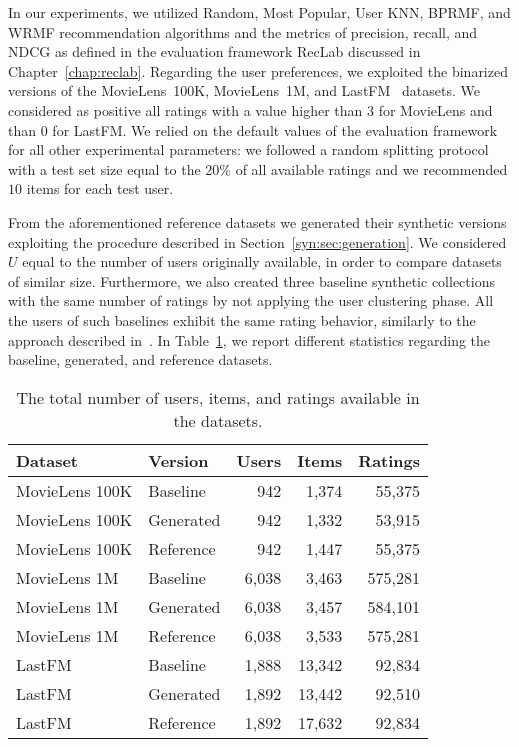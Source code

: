 In our experiments, we utilized Random, Most Popular, User KNN, BPRMF, and WRMF recommendation algorithms and the metrics of precision, recall, and NDCG as defined in the evaluation framework RecLab discussed in Chapter~\ref{chap:reclab}. Regarding the user preferences, we exploited the binarized versions of the MovieLens~100K, MovieLens~1M, and LastFM~\cite{Cantador2011} datasets. We considered as positive all ratings with a value higher than $3$ for MovieLens and than $0$ for LastFM. We relied on the default values of the evaluation framework for all other experimental parameters: we followed a random splitting protocol with a test set size equal to the $20\%$ of all available ratings and we recommended $10$ items for each test user.

From the aforementioned reference datasets we generated their synthetic versions exploiting the procedure described in Section~\ref{syn:sec:generation}. We considered $U$ equal to the number of users originally available, in order to compare datasets of similar size. Furthermore, we also created three baseline synthetic collections with the same number of ratings by not applying the user clustering phase. All the users of such baselines exhibit the same rating behavior, similarly to the approach described in~\cite{CarmenRodriguez-Hernandez2017}. In Table~\ref{syn:tab:stats}, we report different statistics regarding the baseline, generated, and reference datasets.

\begin{table}
\centering
\begin{tabular}{@{}llrrr@{}}
\toprule
Dataset & Version & Users & Items & Ratings \\ \midrule
MovieLens 100K & Baseline & 942 & 1,374 & 55,375 \\
MovieLens 100K & Generated & 942 & 1,332 & 53,915 \\
MovieLens 100K & Reference & 942 & 1,447 & 55,375 \\ \midrule
MovieLens 1M & Baseline & 6,038 & 3,463 & 575,281 \\
MovieLens 1M & Generated & 6,038 & 3,457 & 584,101 \\
MovieLens 1M & Reference & 6,038 & 3,533 & 575,281 \\ \midrule
LastFM & Baseline & 1,888 & 13,342 & 92,834 \\
LastFM & Generated & 1,892 & 13,442 & 92,510 \\
LastFM & Reference & 1,892 & 17,632 & 92,834 \\ \bottomrule
\end{tabular}
\caption[Statistics about the synthetic datasets]{The total number of users, items, and ratings available in the datasets.}
\label{syn:tab:stats}
\end{table}

